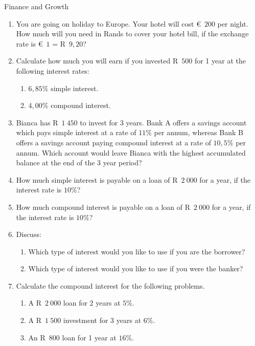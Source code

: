 \begin{eocexercises}{Finance and Growth}
    \begin{enumerate}[label=\textbf{\arabic*}.]
	\item You are going on holiday to Europe. Your hotel will cost €~$200$ per night. How much will you need in Rands to cover your hotel bill, if the exchange rate is €~$1$ = R~$9,20$?

	\item Calculate how much you will earn if you invested R~$500$ for 1 year at the following interest rates:
	\begin{enumerate}
	    \item $6,85\%$ simple interest.
	    \item $4,00\%$ compound interest.
	\end{enumerate}

	\item Bianca has R~$1~450$ to invest for 3 years. Bank A offers a savings account which pays simple interest at a rate of $11\%$ per annum, whereas Bank B offers a savings account paying compound interest at a rate of $10,5\%$ per annum. Which account would leave Bianca with the highest accumulated balance at the end of the 3 year period?

	\item How much simple interest is payable on a loan of R~$2~000$ for a year, if the interest rate is $10\%$?

	\item How much compound interest is payable on a loan of R~$2~000$ for a year, if the interest rate is $10\%$?

	\item Discuss:
	\begin{enumerate}
	    \item Which type of interest would you like to use if you are the borrower?

	    \item Which type of interest would you like to use if you were the banker?
	\end{enumerate}

	\item Calculate the compound interest for the following problems.
	\begin{enumerate}
	    \item A R~$2~000$ loan for 2 years at $5\%$.
	    \item A R~$1~500$ investment for 3 years at $6\%$.
	    \item An R~$800$ loan for 1 year at $16\%$.
	\end{enumerate}


\end{enumerate}
\end{eocexercises}
